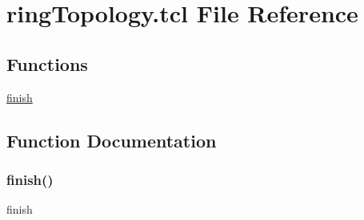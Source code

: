 \hypertarget{ring_topology_8tcl}{}\section{ring\+Topology.\+tcl File Reference}
\label{ring_topology_8tcl}
\subsection*{Functions}
\begin{DoxyCompactItemize}
\item 
\hyperlink{ring_topology_8tcl_a30728837c246b65ef76298af0101d99c}{finish}
\end{DoxyCompactItemize}


\subsection{Function Documentation}
\mbox{\label{ring_topology_8tcl_a30728837c246b65ef76298af0101d99c}} 
\subsubsection{\texorpdfstring{finish()}{finish()}}
{\footnotesize\ttfamily finish}

